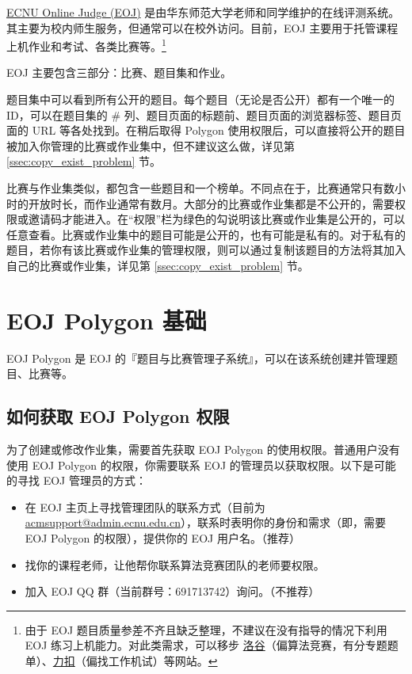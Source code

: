 \documentclass[oneside]{book}
\begin{document}
\label{sec:eoj_basics}

\href{https://acm.ecnu.edu.cn/}{ECNU Online Judge (EOJ)} 是由华东师范大学老师和同学维护的在线评测系统。其主要为校内师生服务，但通常可以在校外访问。目前，EOJ 主要用于托管课程上机作业和考试、各类比赛等。\footnote{由于 EOJ 题目质量参差不齐且缺乏整理，不建议在没有指导的情况下利用 EOJ 练习上机能力。对此类需求，可以移步 \href{https://www.luogu.com.cn/}{洛谷}（偏算法竞赛，有分专题题单）、\href{https://leetcode.cn/}{力扣}（偏找工作机试）等网站。}

EOJ 主要包含三部分：比赛、题目集和作业。

题目集中可以看到所有公开的题目。每个题目（无论是否公开）都有一个唯一的 ID，可以在题目集的 \# 列、题目页面的标题前、题目页面的浏览器标签、题目页面的 URL 等各处找到。在稍后取得 Polygon 使用权限后，可以直接将公开的题目被加入你管理的比赛或作业集中，但不建议这么做，详见第 \ref{ssec:copy_exist_problem} 节。

比赛与作业集类似，都包含一些题目和一个榜单。不同点在于，比赛通常只有数小时的开放时长，而作业通常有数月。大部分的比赛或作业集都是不公开的，需要权限或邀请码才能进入。在``权限''栏为绿色的勾说明该比赛或作业集是公开的，可以任意查看。比赛或作业集中的题目可能是公开的，也有可能是私有的。对于私有的题目，若你有该比赛或作业集的管理权限，则可以通过复制该题目的方法将其加入自己的比赛或作业集，详见第 \ref{ssec:copy_exist_problem} 节。

\section{EOJ Polygon 基础}

EOJ Polygon 是 EOJ 的『题目与比赛管理子系统』，可以在该系统创建并管理题目、比赛等。

\subsection{如何获取 EOJ Polygon 权限}

\label{ssec:eoj_polygon_permission}

为了创建或修改作业集，需要首先获取 EOJ Polygon 的使用权限。普通用户没有使用 EOJ Polygon 的权限，你需要联系 EOJ 的管理员以获取权限。以下是可能的寻找 EOJ 管理员的方式：

\begin{itemize}
    \item 在 EOJ 主页上寻找管理团队的联系方式（目前为 \href{mailto:acmsupport@admin.ecnu.edu.cn}{acmsupport@admin.ecnu.edu.cn}），联系时表明你的身份和需求（即，需要 EOJ Polygon 的权限），提供你的 EOJ 用户名。（推荐）
    \item 找你的课程老师，让他帮你联系算法竞赛团队的老师要权限。
    \item 加入 EOJ QQ 群（当前群号：691713742）询问。（不推荐）
\end{itemize}
\end{document}
